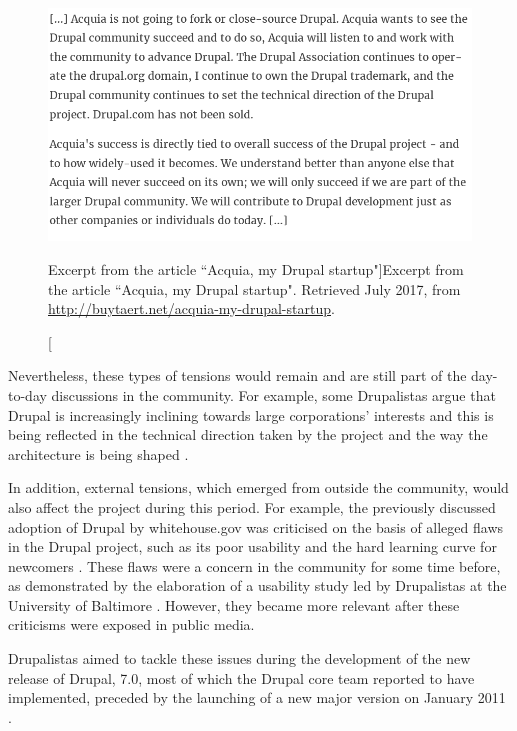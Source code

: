 \begin{figure}[H]
  \centering
\includegraphics[width=\textwidth]{img/quotes_replacement/acquia_announcement.png}
\caption[Excerpt from the article ``Acquia, my Drupal startup"]{Excerpt from the article ``Acquia, my Drupal startup". Retrieved  July 2017, from \url{http://buytaert.net/acquia-my-drupal-startup}.}
\label{acquia_announcement}
\end{figure}

Nevertheless, these types of tensions would remain and are still part of the day-to-day discussions in the community. For example, some Drupalistas argue that Drupal is increasingly inclining towards large corporations' interests and this is being reflected in the technical direction taken by the project and the way the architecture is being shaped \parencite[e.g.][]{Rogers2014, kein-debate-1:2014:Online, kein-debate-2:2014:Online}.

In addition, external tensions, which emerged from outside the community, would also affect the project during this period. For example, the previously discussed adoption of Drupal by whitehouse.gov was criticised on the basis of alleged flaws in the Drupal project, such as its poor usability and the hard learning curve for newcomers \parencite{drupal-whitehouse-critics:Online}. These flaws were a concern in the community for some time before, as demonstrated by the elaboration of a usability study led by Drupalistas at the University of Baltimore \parencite{Scollan2008}. However, they became more relevant after these criticisms were exposed in public media. 

Drupalistas aimed to tackle these issues during the development of the new release of Drupal, 7.0, most of which the Drupal core team reported to have implemented, preceded by the launching of a new major version on  January 2011 \parencite{drupal-7-release:Online}.

